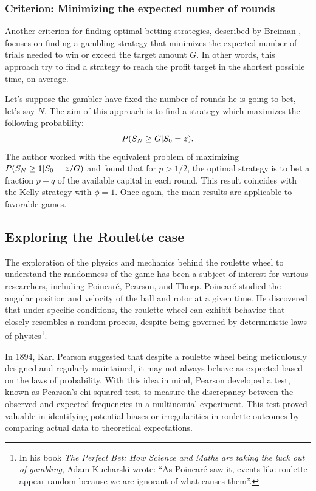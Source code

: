 \documentclass[11pt,twoside]{article}
\numberwithin{Theorem}{section}
\numberwithin{Definition}{section}
\numberwithin{Lemma}{section}
\numberwithin{Algorithm}{section}
\numberwithin{equation}{section}
\begin{document}
\subsubsection{Criterion: Minimizing the expected number of rounds}
Another criterion for finding optimal betting strategies, described by Breiman \cite{Breiman_1961}, focuses on finding a gambling strategy that minimizes the expected number of trials needed to win or exceed the target amount $G$. In other words, this approach try to find a strategy to reach the profit target in the shortest possible time, on average.

Let's suppose the gambler have fixed the number of rounds he is going to bet, let's say $N$. The aim of this approach is to find a strategy which maximizes the following probability:
\begin{equation}
    P(S_{N} \geq G \text{\textbar} S_{0} = z).
\end{equation}
The author worked with the equivalent problem of maximizing 
$P(S_{N} \geq 1 \text{\textbar} S_{0} = z/G)$ and found that for $p > 1/2$, the optimal strategy is to bet a fraction $p - q$ of the available capital in each round. This result coincides with the Kelly strategy with $\phi=1$. Once again, the main results are applicable to favorable games.

\subsection{Exploring the Roulette case}
The exploration of the physics and mechanics behind the roulette wheel to understand the randomness of the game has been a subject of interest for various researchers, including Poincaré, Pearson, and Thorp. Poincaré studied the angular position and velocity of the ball and rotor at a given time. He discovered that under specific conditions, the roulette wheel can exhibit behavior that closely resembles a random process, despite being governed by deterministic laws of physics\footnote{In his book \textit{The Perfect Bet: How Science and Maths are taking the luck out of gambling}, Adam Kucharski wrote: “As Poincaré saw it, events like roulette appear random because we are ignorant of what causes them”.}. 

In 1894, Karl Pearson suggested that despite a roulette wheel being meticulously designed and regularly maintained, it may not always behave as expected based on the laws of probability. With this idea in mind, Pearson developed a test\cite{Agresti}, known as Pearson's chi-squared test, to measure the discrepancy between the observed and expected frequencies in a multinomial experiment. This test proved valuable in identifying potential biases or irregularities in roulette outcomes by comparing actual data to theoretical expectations.
\end{document}
